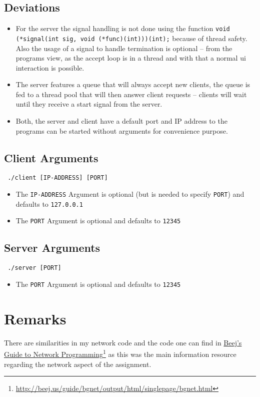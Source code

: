 \documentclass[english,a4paper,12pt]{scrartcl}
\newcommand\fnurl[2]{
  \href{#2}{#1}\footnote{\url{#2}}
}
\begin{document}
  \subsection{Deviations}
    \begin{itemize}
      \item
        For the server the signal handling is not done using the function \linebreak \texttt{void (*signal(int sig, void (*func)(int)))(int);}  because of thread safety. Also the usage of a signal to handle termination is optional -- from the programs view, as the accept loop is in a thread and with that a normal ui interaction is possible.
      \item
        The server features a queue that will always accept new clients, the queue is fed to a thread pool that will then answer client requests -- clients will wait until they receive a start signal from the server.
      \item
        Both, the server and client have a default port and IP address to the programs can be started without arguments for convenience purpose.
    \end{itemize}

  \subsection{Client Arguments}
    \texttt{
      ./client [IP-ADDRESS] [PORT]
    }
    \begin{itemize}
      \item[] The \texttt{IP-ADDRESS} Argument is optional (but is needed to specify \texttt{PORT}) and defaults to \texttt{127.0.0.1}
      \item[] The \texttt{PORT} Argument is optional and defaults to \texttt{12345}
    \end{itemize}
  \subsection{Server Arguments}
    \texttt{
      ./server [PORT]
    }
    \begin{itemize}
      \item[] The \texttt{PORT} Argument is optional and defaults to \texttt{12345}
    \end{itemize}

\section{Remarks}
  There are similarities in my network code and the code one can find in \fnurl{Beej's Guide to Network Programming}{http://beej.us/guide/bgnet/output/html/singlepage/bgnet.html} as this was the main information resource regarding the network aspect of the assignment.
\end{document}
